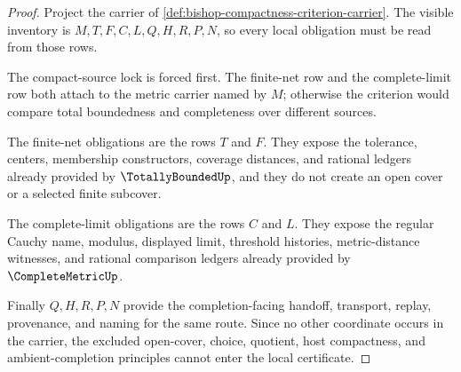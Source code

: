 \begin{proof}
Project the carrier of \autoref{def:bishop-compactness-criterion-carrier}. The visible inventory is $M,T,F,C,L,Q,H,R,P,N$, so every local obligation must be read from those rows.

The compact-source lock is forced first. The finite-net row and the complete-limit row both attach to the metric carrier named by $M$; otherwise the criterion would compare total boundedness and completeness over different sources.

The finite-net obligations are the rows $T$ and $F$. They expose the tolerance, centers, membership constructors, coverage distances, and rational ledgers already provided by $\TotallyBoundedUp$, and they do not create an open cover or a selected finite subcover.

The complete-limit obligations are the rows $C$ and $L$. They expose the regular Cauchy name, modulus, displayed limit, threshold histories, metric-distance witnesses, and rational comparison ledgers already provided by $\CompleteMetricUp$.

Finally $Q,H,R,P,N$ provide the completion-facing handoff, transport, replay, provenance, and naming for the same route. Since no other coordinate occurs in the carrier, the excluded open-cover, choice, quotient, host compactness, and ambient-completion principles cannot enter the local certificate.
\end{proof}

